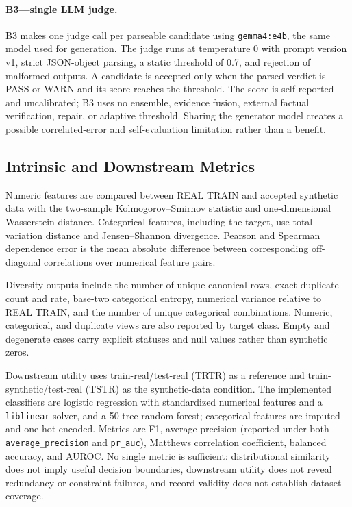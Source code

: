 \paragraph{B3---single LLM judge.}
B3 makes one judge call per parseable candidate using \texttt{gemma4:e4b}, the same
model used for generation. The judge runs at temperature 0 with prompt version
v1, strict JSON-object parsing, a static threshold of 0.7, and rejection of
malformed outputs. A candidate is accepted only when the parsed verdict is
PASS or WARN and its score reaches the threshold. The score is self-reported
and uncalibrated; B3 uses no ensemble, evidence fusion, external factual
verification, repair, or adaptive threshold. Sharing the generator model
creates a possible correlated-error and self-evaluation limitation rather than
a benefit.

\subsection{Intrinsic and Downstream Metrics}

Numeric features are compared between REAL TRAIN and accepted synthetic data
with the two-sample Kolmogorov--Smirnov statistic and one-dimensional
Wasserstein distance. Categorical features, including the target, use total
variation distance and Jensen--Shannon divergence. Pearson and Spearman
dependence error is the mean absolute difference between corresponding
off-diagonal correlations over numerical feature pairs.

Diversity outputs include the number of unique canonical rows, exact duplicate
count and rate, base-two categorical entropy, numerical variance relative to
REAL TRAIN, and the number of unique categorical combinations. Numeric,
categorical, and duplicate views are also reported by target class. Empty and
degenerate cases carry explicit statuses and null values rather than synthetic
zeros.

Downstream utility uses train-real/test-real (TRTR) as a reference and
train-synthetic/test-real (TSTR) as the synthetic-data condition. The
implemented classifiers are logistic regression with standardized numerical
features and a \texttt{liblinear} solver, and a 50-tree random forest; categorical
features are imputed and one-hot encoded. Metrics are F1, average precision
(reported under both \texttt{average\_precision} and \texttt{pr\_auc}), Matthews correlation
coefficient, balanced accuracy, and AUROC. No single metric is sufficient:
distributional similarity does not imply useful decision boundaries,
downstream utility does not reveal redundancy or constraint failures, and
record validity does not establish dataset coverage.

